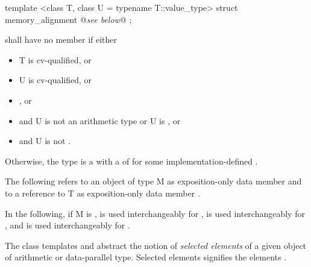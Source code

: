 \begin{itemdecl}
template <class T, class U = typename T::value_type> struct memory_alignment { @\emph{see below}@ };
\end{itemdecl}
\begin{itemdescr}
  \pnum
   shall have no member  if either
  \begin{itemize}
    \item \type T is cv-qualified, or
    \item \type U is cv-qualified, or
    \item {}, or
    \item {} and \type U is not an arithmetic type or \type U is \bool, or
    \item {} and \type U is not \bool.
  \end{itemize}

  \pnum
  Otherwise, the type  is a \BinaryTypeTrait with a \BaseCharacteristic of  for some implementation-defined .
\end{itemdescr}



\pnum
The following refers to an object of type \type M as exposition-only data member  and to a reference to \type T as exposition-only data member .

\pnum In the following, if \type M is \bool,  is used interchangeably for ,
 is used interchangeably for , and
 is used interchangeably for .

\pnum The class templates  and  abstract the notion of \emph{selected elements} of a given object of arithmetic or data-parallel type.
Selected elements signifies the elements  .

